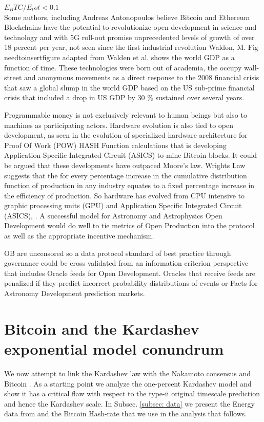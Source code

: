 \documentclass[final,5p,times,twocolumn,authoryear]{elsarticle}
\begin{document}
$E_BTC/E_tot < 0.1$
\\
 Some authors, including Andreas Antonopoulos believe Bitcoin and Ethereum Blockchains have the potential to revolutionize open development in science and technology and with 5G roll-out promise unprecedented levels of growth of over 18 percent per year, not seen since the first industrial revolution Waldon, M.  Fig needtoinsertfigure adapted from Walden et al. shows the world GDP as a function of time. These technologies were born out of academia, the occupy wall-street and anonymous movements as a direct response to the 2008 financial crisis that saw a global slump in the world GDP based on the US sub-prime financial crisis  that included a drop in US GDP by 30 \% sustained over several years.
 
Programmable money is not exclusively relevant to human beings but also to machines as participating actors. Hardware evolution is also tied to open development, as seen in the evolution of specialized hardware architecture for Proof Of Work (POW) HASH Function calculations that is developing Application-Specific Integrated Circuit (ASICS) to mine Bitcoin blocks. It could be argued that these developments have outpaced Moore's law.  Wrights Law suggests that the for every percentage increase in the cumulative distribution function of production in any industry equates to a fixed percentage increase in the efficiency of production. So hardware has evolved from CPU intensive to graphic processing units (GPU) and  Application Specific Integrated Circuit  (ASICS), \cite{10.1371/journal.pone.0052669}. A successful model for Astronomy and Astrophysics Open Development would do well to tie metrics of Open Production into the protocol as well as the appropriate incentive mechanism.       

OB are uncensored so a data protocol standard of best practice through governance could be cross validated from an information criterion perspective that includes Oracle feeds for Open Development.  Oracles that receive feeds are penalized if they predict incorrect probability distributions of events or Facts for Astronomy Development prediction markets. 

\section{Bitcoin and the Kardashev exponential model conundrum}
\label{sec:energy}

We now attempt to link the Kardashev law  \cite{kar64} with the Nakamoto consensus and Bitcoin \cite{nak2009}. As a starting point we analyze the one-percent Kardashev model and show it has a critical flaw with respect to the type-ii original timescale prediction and hence the Kardashev scale. In Subsec. \ref{subsec: data} we present the Energy data from \cite{owidenergy} and the Bitcoin Hash-rate that we use in the analysis that follows. 
\end{document}
